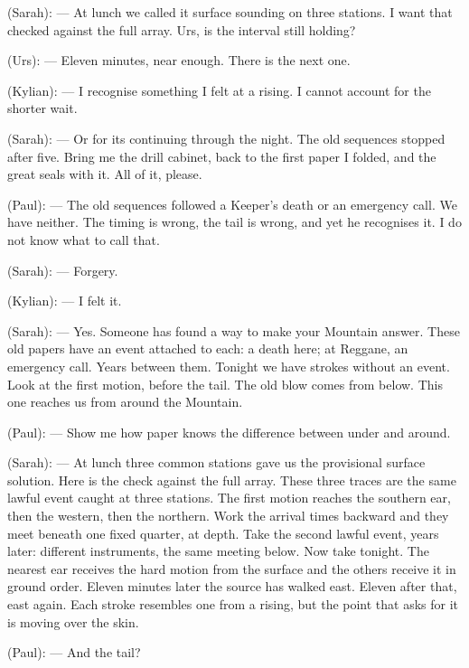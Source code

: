 
\begin{room}

(Sarah): --- At lunch we called it surface sounding on three stations. I want that checked against the full array. Urs, is the interval still holding?

(Urs): --- Eleven minutes, near enough. There is the next one.

(Kylian): --- I recognise something I felt at a rising. I cannot account for the shorter wait.

(Sarah): --- Or for its continuing through the night. The old sequences stopped after five. Bring me the drill cabinet, back to the first paper I folded, and the great seals with it. All of it, please.

\centerline{}

(Paul): --- The old sequences followed a Keeper's death or an emergency call. We have neither. The timing is wrong, the tail is wrong, and yet he recognises it. I do not know what to call that.

(Sarah): --- Forgery.

(Kylian): --- I felt it.

(Sarah): --- Yes. Someone has found a way to make your Mountain answer. These old papers have an event attached to each: a death here; at Reggane, an emergency call. Years between them. Tonight we have strokes without an event. Look at the first motion, before the tail. The old blow comes from below. This one reaches us from around the Mountain.

(Paul): --- Show me how paper knows the difference between under and around.

(Sarah): --- At lunch three common stations gave us the provisional surface solution. Here is the check against the full array. These three traces are the same lawful event caught at three stations. The first motion reaches the southern ear, then the western, then the northern. Work the arrival times backward and they meet beneath one fixed quarter, at depth. Take the second lawful event, years later: different instruments, the same meeting below. Now take tonight. The nearest ear receives the hard motion from the surface and the others receive it in ground order. Eleven minutes later the source has walked east. Eleven after that, east again. Each stroke resembles one from a rising, but the point that asks for it is moving over the skin.

(Paul): --- And the tail?


\end{room}
